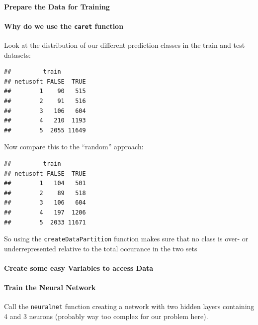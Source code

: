 \documentclass[
]{article}
\begin{document}
\hypertarget{prepare-the-data-for-training}{%
\paragraph{Prepare the Data for
Training}\label{prepare-the-data-for-training}}

\hypertarget{why-do-we-use-the-caret-function}{%
\paragraph{\texorpdfstring{Why do we use the \texttt{caret}
function}{Why do we use the caret function}}\label{why-do-we-use-the-caret-function}}

Look at the distribution of our different prediction classes in the
train and test datasets:

\begin{verbatim}
##         train
## netusoft FALSE  TRUE
##        1    90   515
##        2    91   516
##        3   106   604
##        4   210  1193
##        5  2055 11649
\end{verbatim}

Now compare this to the ``random'' approach:

\begin{verbatim}
##         train
## netusoft FALSE  TRUE
##        1   104   501
##        2    89   518
##        3   106   604
##        4   197  1206
##        5  2033 11671
\end{verbatim}

So using the \texttt{createDataPartition} function makes sure that no
class is over- or underrepresented relative to the total occurance in
the two sets

\hypertarget{create-some-easy-variables-to-access-data}{%
\paragraph{Create some easy Variables to access
Data}\label{create-some-easy-variables-to-access-data}}

\hypertarget{train-the-neural-network}{%
\paragraph{Train the Neural Network}\label{train-the-neural-network}}

Call the \texttt{neuralnet} function creating a network with two hidden
layers containing 4 and 3 neurons (probably way too complex for our
problem here).
\end{document}
